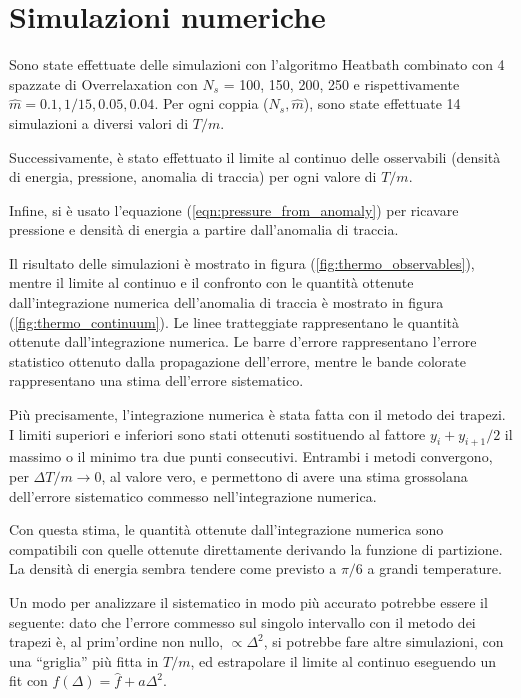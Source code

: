 \documentclass[a4paper,11pt]{article}
\begin{document}
    
    \section{Simulazioni numeriche}
    
    Sono state effettuate delle simulazioni con l'algoritmo Heatbath combinato con 4 spazzate di Overrelaxation con $N_s$ = 100, 150, 200, 250 e rispettivamente $\hat{m} = 0.1, 1/15, 0.05, 0.04$. Per ogni coppia ($N_s, \hat{m}$), sono state effettuate 14 simulazioni a diversi valori di $T/m$. 
    
    Successivamente, è stato effettuato il limite al continuo delle osservabili (densità di energia, pressione, anomalia di traccia) per ogni valore di $T/m$. 
    
    Infine, si è usato l'equazione (\ref{eqn:pressure_from_anomaly}) per ricavare pressione e densità di energia a partire dall'anomalia di traccia.
    
    Il risultato delle simulazioni è mostrato in figura (\ref{fig:thermo_observables}), mentre il limite al continuo e il confronto con le quantità ottenute dall'integrazione numerica dell'anomalia di traccia è mostrato in figura (\ref{fig:thermo_continuum}). Le linee tratteggiate rappresentano le quantità ottenute dall'integrazione numerica. Le barre d'errore rappresentano l'errore statistico ottenuto dalla propagazione dell'errore, mentre le bande colorate rappresentano una stima dell'errore sistematico.
    
    Più precisamente, l'integrazione numerica è stata fatta con il metodo dei trapezi. I limiti superiori e inferiori sono stati ottenuti sostituendo al fattore $y_i + y_{i+1} / 2$ il massimo o il minimo tra due punti consecutivi. Entrambi i metodi convergono, per $\Delta T/m \to 0$, al valore vero, e permettono di avere una stima grossolana dell'errore sistematico commesso nell'integrazione numerica.
    
    Con questa stima, le quantità ottenute dall'integrazione numerica sono compatibili con quelle ottenute direttamente derivando la funzione di partizione. La densità di energia sembra tendere come previsto a $\pi / 6$ a grandi temperature. 
    
    Un modo per analizzare il sistematico in modo più accurato potrebbe essere il seguente: dato che l'errore commesso sul singolo intervallo con il metodo dei trapezi è, al prim'ordine non nullo, $\propto \Delta^2$, si potrebbe fare altre simulazioni, con una ``griglia'' più fitta in $T/m$, ed estrapolare il limite al continuo eseguendo un fit con $f(\Delta) = \hat{f} + a \Delta^2$.
    
\end{document}
